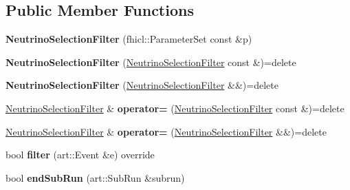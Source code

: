 \subsection*{Public Member Functions}
\begin{DoxyCompactItemize}
\item 
{\bfseries Neutrino\+Selection\+Filter} (fhicl\+::\+Parameter\+Set const \&p)\hypertarget{classNeutrinoSelectionFilter_adb0e654d928530db4d15774bf087f20e}{}\label{classNeutrinoSelectionFilter_adb0e654d928530db4d15774bf087f20e}

\item 
{\bfseries Neutrino\+Selection\+Filter} (\hyperlink{classNeutrinoSelectionFilter}{Neutrino\+Selection\+Filter} const \&)=delete\hypertarget{classNeutrinoSelectionFilter_a63f661621e76ad30756e4ef1b2d54a9d}{}\label{classNeutrinoSelectionFilter_a63f661621e76ad30756e4ef1b2d54a9d}

\item 
{\bfseries Neutrino\+Selection\+Filter} (\hyperlink{classNeutrinoSelectionFilter}{Neutrino\+Selection\+Filter} \&\&)=delete\hypertarget{classNeutrinoSelectionFilter_aa32241ed5db76e990a8a36055413c78a}{}\label{classNeutrinoSelectionFilter_aa32241ed5db76e990a8a36055413c78a}

\item 
\hyperlink{classNeutrinoSelectionFilter}{Neutrino\+Selection\+Filter} \& {\bfseries operator=} (\hyperlink{classNeutrinoSelectionFilter}{Neutrino\+Selection\+Filter} const \&)=delete\hypertarget{classNeutrinoSelectionFilter_a49e2154a532eaa0f50270299b90c5bce}{}\label{classNeutrinoSelectionFilter_a49e2154a532eaa0f50270299b90c5bce}

\item 
\hyperlink{classNeutrinoSelectionFilter}{Neutrino\+Selection\+Filter} \& {\bfseries operator=} (\hyperlink{classNeutrinoSelectionFilter}{Neutrino\+Selection\+Filter} \&\&)=delete\hypertarget{classNeutrinoSelectionFilter_a487b0e18767f6cee88556b38f3ddff3d}{}\label{classNeutrinoSelectionFilter_a487b0e18767f6cee88556b38f3ddff3d}

\item 
bool {\bfseries filter} (art\+::\+Event \&e) override\hypertarget{classNeutrinoSelectionFilter_a397e90eb7ce59516d4f7ba2338e40f6c}{}\label{classNeutrinoSelectionFilter_a397e90eb7ce59516d4f7ba2338e40f6c}

\item 
bool {\bfseries end\+Sub\+Run} (art\+::\+Sub\+Run \&subrun)\hypertarget{classNeutrinoSelectionFilter_a7a8b5679956b4addd5eda2a31e033ca3}{}\label{classNeutrinoSelectionFilter_a7a8b5679956b4addd5eda2a31e033ca3}

\end{DoxyCompactItemize}
